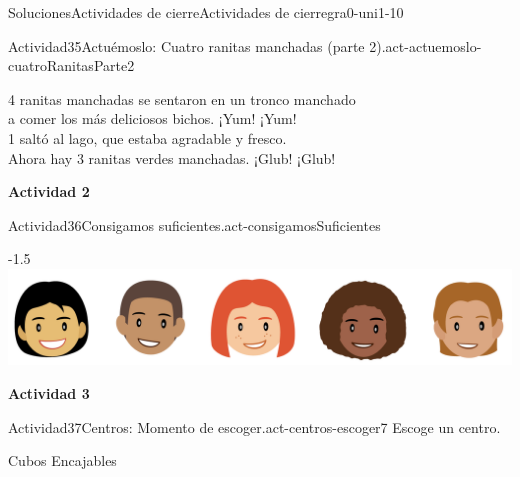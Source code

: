 \documentclass[twoside,10pt,]{article}
\begin{document}
\begin{solutions-section}{Soluciones}{Actividades de cierre}{}{Actividades de cierre}{}{}{gra0-uni1-10}
\begin{activitysolution}{Actividad}{35}{Actuémoslo: Cuatro ranitas manchadas (parte 2).}{act-actuemoslo-cuatroRanitasParte2}
\begin{image}{0.275}{0.45}{0.275}{}
\end{image}%
%
\par
4 ranitas manchadas se sentaron en un tronco manchado\\
 a comer los más deliciosos bichos. ¡Yum! ¡Yum!\\
 1 saltó al lago, que estaba agradable y fresco.\\
 Ahora hay 3 ranitas verdes manchadas. ¡Glub! ¡Glub!%
\end{activitysolution}%
\par\medskip
\noindent\textbf{\large{}\space\textperiodcentered\space{}Actividad 2}
\begin{activitysolution}{Actividad}{36}{Consigamos suficientes.}{act-consigamosSuficientes}%
\begin{image}{0.125}{0.75}{0.125}{-1.5\baselineskip}%
\includegraphics[width=\linewidth]{external/png-source/K.1 Revisions.StudentFacesInARow.png}
\end{image}%
\end{activitysolution}%
\par\medskip
\noindent\textbf{\large{}\space\textperiodcentered\space{}Actividad 3}
\begin{activitysolution}{Actividad}{37}{Centros: Momento de escoger.}{act-centros-escoger7}%
Escoge un centro.%
\begin{sidebyside}{2}{0.025}{0.025}{0.05}%
\begin{sbspanel}{0.45}%
Cubos Encajables%
\par

\end{sbspanel}
\end{sidebyside}
\end{activitysolution}
\end{solutions-section}
\end{document}
